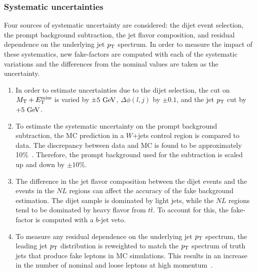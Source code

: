 \subsubsection{Systematic uncertainties}\label{ssww13tev:ff_systematics}
Four sources of systematic uncertainty are considered: the dijet event selection, the prompt background subtraction, the jet flavor composition, and residual dependence on the underlying jet $p_{\mathrm{T}}$ spectrum.
In order to measure the impact of these systematics, new fake-factors are computed with each of the systematic variations and the differences from the nominal values are taken as the uncertainty.
\begin{enumerate}
\item In order to estimate uncertainties due to the dijet selection, the cut on $M_{\textrm{T}}+E_{\mathrm{T}}^{\mathrm{miss}}$ is varied by $\pm5\gev$, $\Delta\phi(l,j)$ by $\pm 0.1$, and the jet $p_{\mathrm{T}}$ cut by $+5\gev$.
\item To estimate the systematic uncertainty on the prompt background subtraction, the MC prediction in a $W$+jets control region is compared to data.  The discrepancy between data and MC is found to be approximately 10\%~\cite{2018.ssww-13tev-atlas-support}.  Therefore, the prompt background used for the subtraction is scaled up and down by $\pm 10\%$.
\item The difference in the jet flavor composition between the dijet events and the events in the $NL$ regions can affect the accuracy of the fake background estimation.  The dijet sample is dominated by light jets, while the $NL$ regions tend to be dominated by heavy flavor from $t\bar{t}$.  To account for this, the fake-factor is computed with a $b$-jet veto.
\item To measure any residual dependence on the underlying jet $p_{\mathrm{T}}$ spectrum, the leading jet $p_{\mathrm{T}}$ distribution is reweighted to match the $p_{\mathrm{T}}$ spectrum of truth jets that produce fake leptons in MC simulations.  This results in an increase in the number of nominal and loose leptons at high momentum~\cite{2018.ssww-13tev-atlas-support}.
\end{enumerate}

